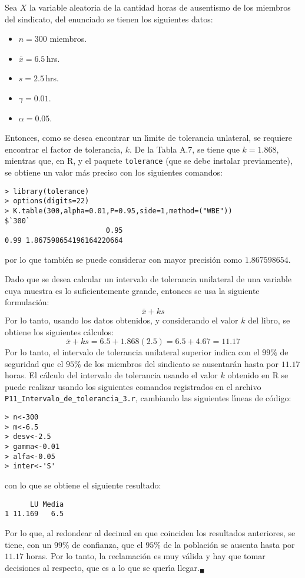 \begin{solucion}
 Sea $X$ la variable aleatoria de la cantidad horas de ausentismo de los miembros del sindicato, del enunciado se tienen los siguientes datos:
 \begin{itemize}
  \item $n = 300$ miembros.
  \item $\bar{x} = 6.5\,$hrs.
  \item $s = 2.5\,$hrs.
  \item $\gamma = 0.01$.
  \item $\alpha = 0.05$.
 \end{itemize}
 Entonces, como se desea encontrar un l\'{\i}mite de tolerancia unlateral, se requiere encontrar el factor de tolerancia, $k$. De la Tabla A.7, se tiene que $k = 1.868$, mientras que, en R, y el paquete \texttt{tolerance} (que se debe instalar previamente), se obtiene un valor m\'as preciso con los siguientes comandos:
 \begin{verbatim}
> library(tolerance)
> options(digits=22)
> K.table(300,alpha=0.01,P=0.95,side=1,method=("WBE"))
$`300`
                        0.95
0.99 1.867598654196164220664
 \end{verbatim}
 \vspace{-0.5cm}
 por lo que tambi\'en se puede considerar con mayor precisi\'on como $1.867598654$.
 \par 
 Dado que se desea calcular un intervalo de tolerancia unilateral de una variable cuya muestra es lo suficientemente grande, entonces se usa la siguiente formulaci\'on:
 \begin{equation*}
  \bar{x} + ks
 \end{equation*}
 Por lo tanto, usando los datos obtenidos, y considerando el valor $k$ del libro, se obtiene los siguientes c\'alculos:
 \begin{equation*}
  \bar{x} + ks = 6.5 + 1.868(2.5) = 6.5 + 4.67 = 11.17
 \end{equation*}
 Por lo tanto, el intervalo de tolerancia unilateral superior indica con el $99\%$ de seguridad que el $95\%$ de los miembros del sindicato se ausentar\'an hasta por $11.17$ horas. El c\'alculo del intervalo de tolerancia usando el valor $k$ obtenido en R se puede realizar usando los siguientes comandos registrados en el archivo \texttt{P11\_Intervalo\_de\_tolerancia\_3.r}, cambiando las siguientes l\'{\i}neas de c\'odigo:
 \begin{verbatim}
> n<-300
> m<-6.5
> desv<-2.5
> gamma<-0.01
> alfa<-0.05
> inter<-'S'
 \end{verbatim}
 \vspace{-0.5cm}
 con lo que se obtiene el siguiente resultado:
 \begin{verbatim}
      LU Media
1 11.169   6.5
 \end{verbatim}
 \vspace{-0.5cm}
 Por lo que, al redondear al decimal en que coinciden los resultados anteriores, se tiene, con un $99\%$ de confianza, que el $95\%$ de la poblaci\'on se ausenta hasta por $11.17$ horas. Por lo tanto, la reclamaci\'on es muy v\'alida y hay que tomar decisiones al respecto, que es a lo que se quer\'{\i}a llegar.${}_{\blacksquare}$
\end{solucion}
